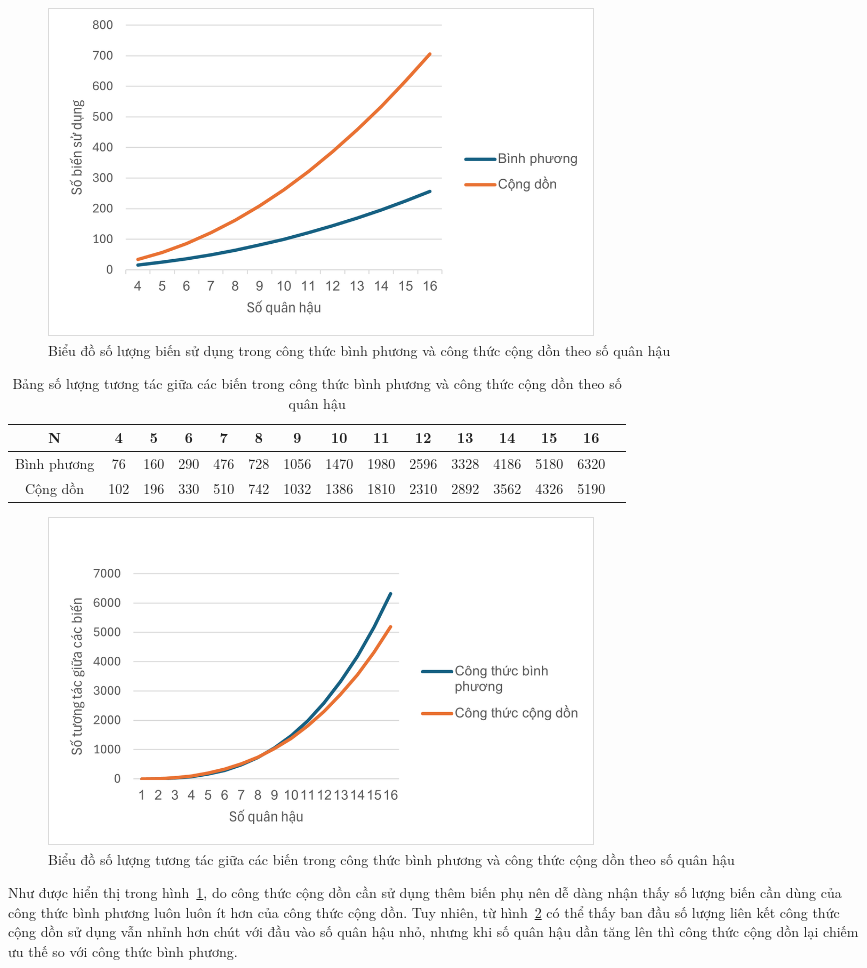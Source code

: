 	\begin{figure}[H]
		\centering
		\includegraphics[width=0.7\textwidth]{images/methods/var_num.png}
		\caption{Biểu đồ số lượng biến sử dụng trong công thức bình phương và công thức cộng dồn theo số quân hậu}
		\label{fig:var_num}
	\end{figure}
	
	\begin{table}[H]
		\centering
		\begin{tabular}{|c|c|c|c|c|c|c|c|c|c|c|c|c|c|c|}
			\hline
			N & 4 & 5 & 6 & 7 & 8 & 9 & 10 & 11 & 12 & 13 & 14 & 15 & 16 \\
			\hline
			Bình phương & 76 & 160 & 290 & 476 & 728 & 1056 & 1470 & 1980 & 2596 & 3328 & 4186 & 5180 & 6320 \\
			\hline
			Cộng dồn & 102 & 196 & 330 & 510 & 742 & 1032 & 1386 & 1810 & 2310 & 2892 & 3562 & 4326 & 5190 \\
			\hline
		\end{tabular}
		
		
		
		\caption{Bảng số lượng tương tác giữa các biến trong công thức bình phương và công thức cộng dồn theo số quân hậu}
		\label{tab:interaction_num_cmp}
	\end{table}
	
	\begin{figure}[H]
		\centering
		\includegraphics[width=0.7\textwidth]{images/interaction_num_cmp.png}
		\caption{Biểu đồ số lượng tương tác giữa các biến trong công thức bình phương và công thức cộng dồn theo số quân hậu }
		\label{fig:interaction_num_cmp}
	\end{figure}
	Như được hiển thị trong hình~\ref{fig:var_num}, do công thức cộng dồn cần sử dụng thêm biến phụ nên dễ dàng nhận thấy số lượng biến cần dùng của công thức bình phương luôn luôn ít hơn của công thức cộng dồn. Tuy nhiên, từ hình~\ref{fig:interaction_num_cmp} có thể thấy ban đầu số lượng liên kết công thức cộng dồn sử dụng vẫn nhỉnh hơn chút với đầu vào số quân hậu nhỏ, nhưng khi số quân hậu dần tăng lên thì công thức cộng dồn lại chiếm ưu thế so với công thức bình phương.



